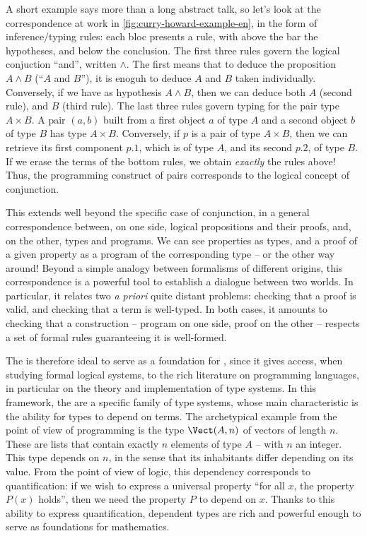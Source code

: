 A short example says more than a long abstract talk, so let’s look at the correspondence
at work in \cref{fig:curry-howard-example-en}, in the form of inference/typing rules:
each bloc presents a rule, with above the bar the hypotheses, and below the conclusion.
The first three rules govern the logical conjuction “and”, written $\wedge$.
The first means that to deduce the proposition $A \wedge B$ (“$A$ and $B$”), it is enoguh
to deduce $A$ and $B$ taken individually.
Conversely, if we have as hypothesis $A \wedge B$, then we can deduce both $A$ (second rule),
and $B$ (third rule).
The last three rules govern typing%
for the pair type $A \times B$. A pair $(a,b)$ built
from a first object $a$ of type $A$ and a second object $b$ of type $B$ has type $A \times B$.
Conversely, if $p$ is a pair of type $A \times B$, then we can retrieve its first component
$p.1$, which is of type $A$, and its second $p.2$, of type $B$.
If we erase the terms%
of the bottom rules, we obtain \emph{exactly} the rules above!
Thus, the programming construct of pairs corresponds to the logical concept of conjunction.

This extends well beyond the specific case of conjunction, in a general correspondence
between, on one side, logical propositions and their proofs, and, on the other, types and programs.
We can see properties as types, and a proof of a given property as a program of the
corresponding type – or the other way around!
Beyond a simple analogy between formalisms of different origins, this correspondence
is a powerful tool to establish a dialogue between two worlds. In particular, it
relates two \textit{a priori} quite distant problems: checking that a proof
is valid, and checking that a term is well-typed. In both cases, it amounts to checking that
a construction – program on one side, proof on the other – respects a set of formal
rules guaranteeing it is well-formed.

The  is therefore ideal to serve as a foundation for
, since it gives access, when studying formal logical systems,
to the rich literature on programming languages, in particular on the theory and
implementation of type systems. In this framework, the
 are a specific family of type systems,
whose main characteristic is the ability for types to depend on terms. The archetypical
example from the point of view of programming is the type $\Vect(A,n)$
of vectors of length $n$. These are lists that contain exactly $n$ elements of type $A$ – with
$n$ an integer.
This type depends on $n$, in the sense that its inhabitants differ depending on its value.
From the point of view of logic, this dependency corresponds to quantification: if we
wish to express a universal property “for all $x$, the property $P(x)$ holds”, then we need
the property $P$ to depend on $x$.
Thanks to this ability to express quantification, dependent types are rich and powerful enough
to serve as foundations for mathematics.

